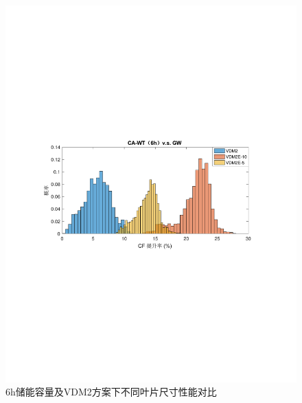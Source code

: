 \begin{figure}[H] %
  \centering
  \includegraphics[scale=0.75]{figures/Chap5-CA-WT-6h-VS-GW-VDM2E.pdf}
  \caption{6h储能容量及VDM2方案下不同叶片尺寸性能对比}
  \label{fig:CA-WT-6h-VS-GW-VDM2E}
\end{figure}

